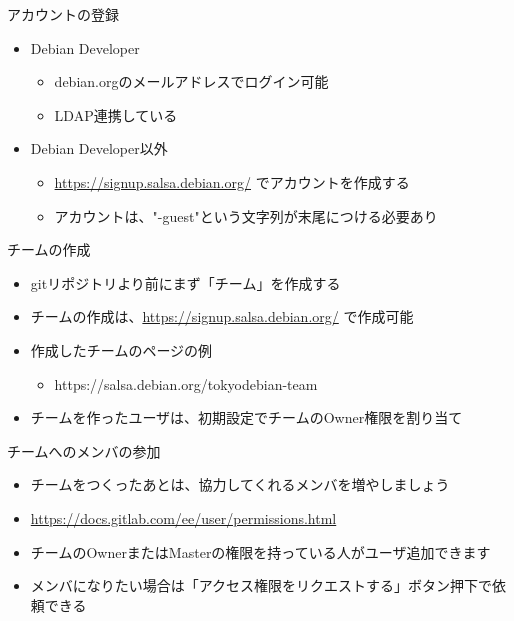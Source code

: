 \begin{frame}[containsverbatim]{アカウントの登録}
  \begin{itemize}
  \item Debian Developer
    \begin{itemize}
    \item debian.orgのメールアドレスでログイン可能
    \item LDAP連携している
    \end{itemize}
  \item Debian Developer以外
    \begin{itemize}
    \item \url{https://signup.salsa.debian.org/} でアカウントを作成する
    \item アカウントは、"-guest"という文字列が末尾につける必要あり
    \end{itemize}
  \end{itemize}
\end{frame}

\begin{frame}[containsverbatim]{チームの作成}
  \begin{itemize}
  \item gitリポジトリより前にまず「チーム」を作成する
  \item チームの作成は、\url{https://signup.salsa.debian.org/} で作成可能
  \item 作成したチームのページの例
    \begin{itemize}
      \item https://salsa.debian.org/tokyodebian-team
    \end{itemize}
  \item チームを作ったユーザは、初期設定でチームのOwner権限を割り当て
  \end{itemize}
\end{frame}

\begin{frame}[containsverbatim]{チームへのメンバの参加}
  \begin{itemize}
  \item チームをつくったあとは、協力してくれるメンバを増やしましょう
  \item \url{https://docs.gitlab.com/ee/user/permissions.html}
  \item チームのOwnerまたはMasterの権限を持っている人がユーザ追加できます
  \item メンバになりたい場合は「アクセス権限をリクエストする」ボタン押下で依頼できる
  \end{itemize}
\end{frame}

